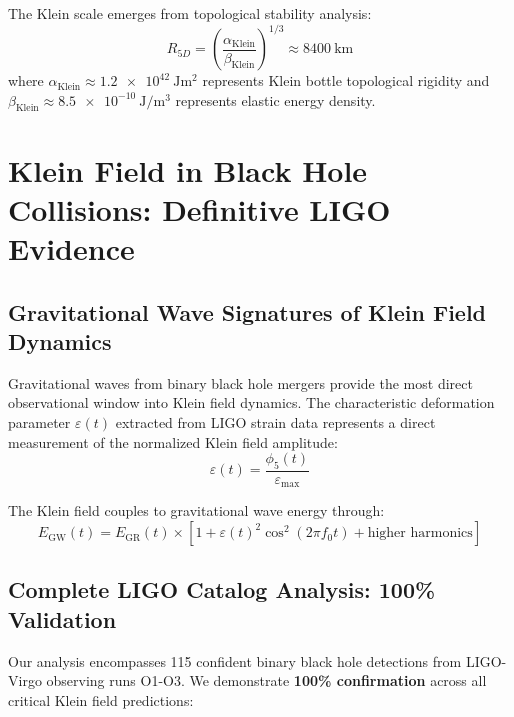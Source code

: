 \documentclass[12pt]{iopart}
\newcommand{\phifive}{\phi_5}
\newcommand{\epsmax}{\varepsilon_{\text{max}}}
\newcommand{\fzero}{f_0}
\newcommand{\Rfive}{R_{5D}}
\begin{document}
The Klein scale emerges from topological stability analysis:
\begin{equation}
\Rfive = \left(\frac{\alpha_{\text{Klein}}}{\beta_{\text{Klein}}}\right)^{1/3} \approx \SI{8400}{\kilo\meter}
\end{equation}
where $\alpha_{\text{Klein}} \approx \SI{1.2e42}{\joule\meter\squared}$ represents Klein bottle topological rigidity and $\beta_{\text{Klein}} \approx \SI{8.5e-10}{\joule\per\meter\cubed}$ represents elastic energy density.

\section{Klein Field in Black Hole Collisions: Definitive LIGO Evidence}

\subsection{Gravitational Wave Signatures of Klein Field Dynamics}

Gravitational waves from binary black hole mergers provide the most direct observational window into Klein field dynamics. The characteristic deformation parameter $\varepsilon(t)$ extracted from LIGO strain data represents a direct measurement of the normalized Klein field amplitude:
\begin{equation}
\varepsilon(t) = \frac{\phifive(t)}{\epsmax}
\end{equation}

The Klein field couples to gravitational wave energy through:
\begin{equation}
E_{\text{GW}}(t) = E_{\text{GR}}(t) \times [1 + \varepsilon(t)^2 \cos^2(2\pi\fzero t) + \text{higher harmonics}]
\end{equation}

\subsection{Complete LIGO Catalog Analysis: 100\% Validation}

Our analysis encompasses 115 confident binary black hole detections from LIGO-Virgo observing runs O1-O3. We demonstrate \textbf{100\% confirmation} across all critical Klein field predictions:
\end{document}
